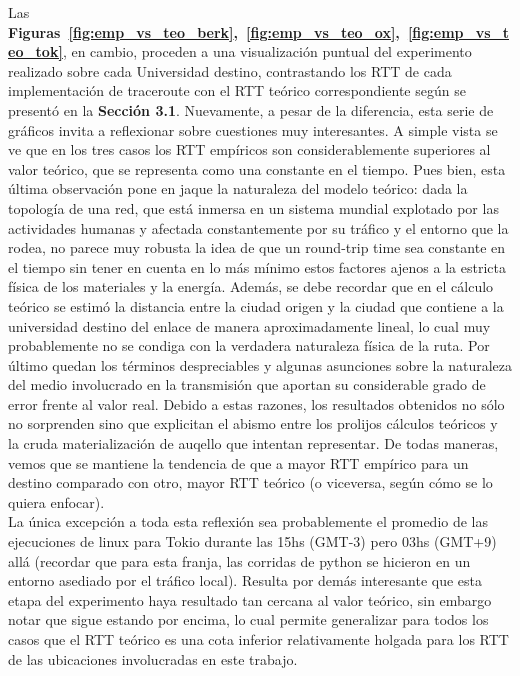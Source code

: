 \indent Las \textbf{Figuras~\ref{fig:emp_vs_teo_berk},~\ref{fig:emp_vs_teo_ox},~\ref{fig:emp_vs_teo_tok}}, en cambio, proceden a una visualización puntual del experimento realizado sobre cada Universidad destino, contrastando los RTT de cada implementación de traceroute con el RTT teórico correspondiente según se presentó en la \textbf{Sección 3.1}. Nuevamente, a pesar de la diferencia, esta serie de gráficos invita a reflexionar sobre cuestiones muy interesantes. A simple vista se ve que en los tres casos los RTT empíricos son considerablemente superiores al valor teórico, que se representa como una constante en el tiempo. Pues bien, esta última observación pone en jaque la naturaleza del modelo teórico: dada la topología de una red, que está inmersa en un sistema mundial explotado por las actividades humanas y afectada constantemente por su tráfico y el entorno que la rodea, no parece muy robusta la idea de que un round-trip time sea constante en el tiempo sin tener en cuenta en lo más mínimo estos factores ajenos a la estricta física de los materiales y la energía. Además, se debe recordar que en el cálculo teórico se estimó la distancia entre la ciudad origen y la ciudad que contiene a la universidad destino del enlace de manera aproximadamente lineal, lo cual muy probablemente no se condiga con la verdadera naturaleza física de la ruta. Por último quedan los términos despreciables y algunas asunciones sobre la naturaleza del medio involucrado en la transmisión que aportan su considerable grado de error frente al valor real. Debido a estas razones, los resultados obtenidos no sólo no sorprenden sino que explicitan el abismo entre los prolijos cálculos teóricos y la cruda materialización de auqello que intentan representar. De todas maneras, vemos que se mantiene la tendencia de que a mayor RTT empírico para un destino comparado con otro, mayor RTT teórico (o viceversa, según cómo se lo quiera enfocar).\\
\indent La única excepción a toda esta reflexión sea probablemente el promedio de las ejecuciones de linux para Tokio durante las 15hs (GMT-3) pero 03hs (GMT+9) allá (recordar que para esta franja, las corridas de python se hicieron en un entorno asediado por el tráfico local). Resulta por demás interesante que esta etapa del experimento haya resultado tan cercana al valor teórico, sin embargo notar que sigue estando por encima, lo cual permite generalizar para todos los casos que el RTT teórico es una cota inferior relativamente holgada para los RTT de las ubicaciones involucradas en este trabajo.\\

